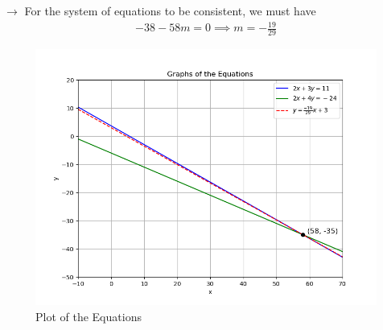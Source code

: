 \documentclass[journal]{IEEEtran}
\begin{document}
$\rightarrow$ For the system of equations to be consistent, we must have
\begin{align}
    -38 - 58m = 0 \implies m = -\frac{19}{29}
\end{align}
\begin{figure}[h!]
   \centering
   \includegraphics[width=0.75\linewidth]{figs/01.png}
   \caption{Plot of the Equations}
   \label{Plot_1}
\end{figure}
\end{document}
